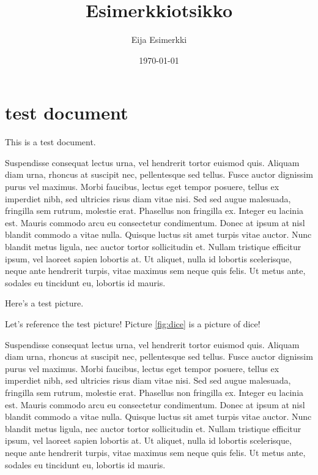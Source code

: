 \documentclass{jamk-report}
\title{Esimerkkiotsikko}
\author{Eija Esimerkki}
\date{\today}
\begin{document}
\frontmatter      %


\maketitle        %


\mainmatter       %



\section{test document}

This is a test document.

Suspendisse consequat lectus urna, vel hendrerit tortor euismod quis. Aliquam
diam urna, rhoncus at suscipit nec, pellentesque sed tellus. Fusce auctor
dignissim purus vel maximus. Morbi faucibus, lectus eget tempor posuere, tellus
ex imperdiet nibh, sed ultricies risus diam vitae nisi. Sed sed augue
malesuada, fringilla sem rutrum, molestie erat.  Phasellus non fringilla ex.
Integer eu lacinia est. Mauris commodo arcu eu consectetur condimentum. Donec
at ipsum at nisl blandit commodo a vitae nulla.  Quisque luctus sit amet turpis
vitae auctor. Nunc blandit metus ligula, nec auctor tortor sollicitudin et.
Nullam tristique efficitur ipsum, vel laoreet sapien lobortis at. Ut aliquet,
nulla id lobortis scelerisque, neque ante hendrerit turpis, vitae maximus sem
neque quis felis. Ut metus ante, sodales eu tincidunt eu, lobortis id mauris.


Here's a test picture.


Let's reference the test picture! Picture \ref{fig:dice} is a picture of
dice!


Suspendisse consequat lectus urna, vel hendrerit tortor euismod quis. Aliquam
diam urna, rhoncus at suscipit nec, pellentesque sed tellus. Fusce auctor
dignissim purus vel maximus. Morbi faucibus, lectus eget tempor posuere, tellus
ex imperdiet nibh, sed ultricies risus diam vitae nisi. Sed sed augue
malesuada, fringilla sem rutrum, molestie erat.  Phasellus non fringilla ex.
Integer eu lacinia est. Mauris commodo arcu eu consectetur condimentum. Donec
at ipsum at nisl blandit commodo a vitae nulla.  Quisque luctus sit amet turpis
vitae auctor. Nunc blandit metus ligula, nec auctor tortor sollicitudin et.
Nullam tristique efficitur ipsum, vel laoreet sapien lobortis at. Ut aliquet,
nulla id lobortis scelerisque, neque ante hendrerit turpis, vitae maximus sem
neque quis felis. Ut metus ante, sodales eu tincidunt eu, lobortis id mauris.
\end{document}
